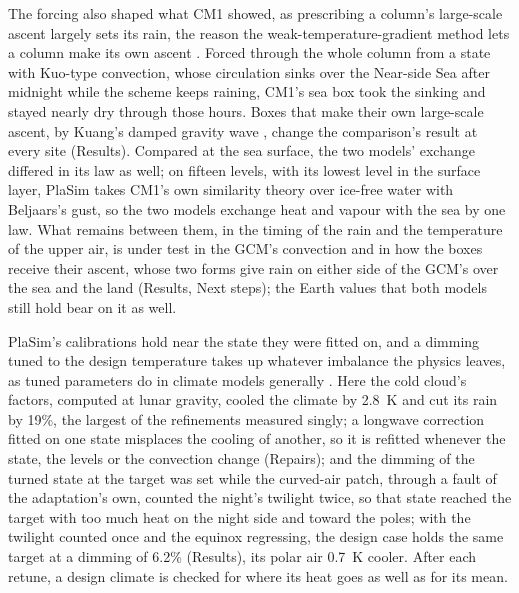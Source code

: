 The forcing also shaped what CM1 showed, as prescribing a column's large-scale ascent largely sets its rain, the
reason the weak-temperature-gradient method lets a column make its own ascent \autocite{sobel2000modeling}. Forced through
the whole column from a state with Kuo-type convection, whose circulation sinks over the Near-side Sea after
midnight while the scheme keeps raining, CM1's sea box took the sinking and stayed nearly dry through those
hours. Boxes that make their own large-scale ascent, by
Kuang's damped gravity wave \autocite{kuang2008modeling}, change the comparison's result at every site
(Results). Compared at the sea surface, the two models' exchange differed in its law as well; on fifteen
levels, with its lowest level in the surface layer, PlaSim takes CM1's own similarity theory over ice-free water with
Beljaars's gust, so the two models exchange heat and vapour with the sea by one law. What remains between them, in
the timing of the rain and the temperature of the upper air, is under test in the GCM's convection and in how the
boxes receive their ascent, whose two forms give rain on either side of the GCM's over the sea and the land
(Results, Next steps); the Earth values that both models still hold bear on it as
well.

PlaSim's calibrations hold near the state they were fitted on, and a dimming tuned to the design temperature takes
up whatever imbalance the physics leaves, as tuned parameters do in climate models generally
\autocite{hourdin2017art}. Here the cold cloud's factors, computed at lunar gravity, cooled the climate by 2.8~K and
cut its rain by 19\%, the largest of the refinements measured singly; a longwave correction fitted on one state
misplaces the cooling of another, so it is refitted whenever the state, the levels or the convection change
(Repairs); and the dimming of the turned state at the target was set while the curved-air patch, through a fault of the
adaptation's own, counted the night's twilight twice, so that state reached the target with too much heat on the
night side and toward the poles; with the twilight counted once and the equinox regressing, the design case holds
the same target at a dimming of 6.2\% (Results), its polar air 0.7~K cooler. After each retune, a design climate is checked for where its heat
goes as well as for its mean.

